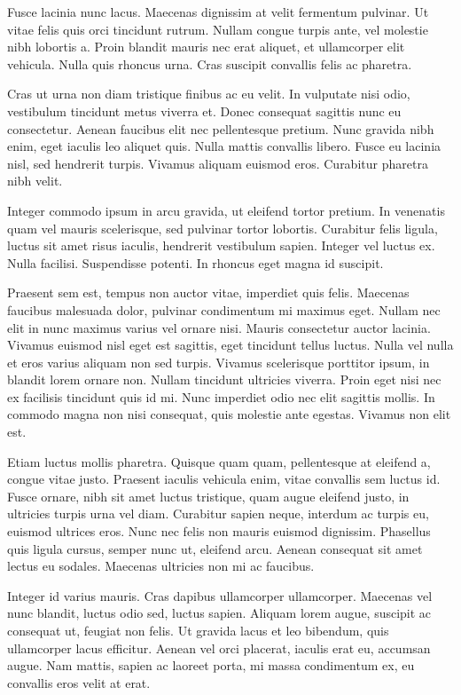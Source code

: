 \documentclass{article}
\begin{document}
	Fusce lacinia nunc lacus. Maecenas dignissim at velit fermentum pulvinar. Ut vitae felis quis orci tincidunt rutrum. Nullam congue turpis ante, vel molestie nibh lobortis a. Proin blandit mauris nec erat aliquet, et ullamcorper elit vehicula. Nulla quis rhoncus urna. Cras suscipit convallis felis ac pharetra.
	
	Cras ut urna non diam tristique finibus ac eu velit. In vulputate nisi odio, vestibulum tincidunt metus viverra et. Donec consequat sagittis nunc eu consectetur. Aenean faucibus elit nec pellentesque pretium. Nunc gravida nibh enim, eget iaculis leo aliquet quis. Nulla mattis convallis libero. Fusce eu lacinia nisl, sed hendrerit turpis. Vivamus aliquam euismod eros. Curabitur pharetra nibh velit.
	
	Integer commodo ipsum in arcu gravida, ut eleifend tortor pretium. In venenatis quam vel mauris scelerisque, sed pulvinar tortor lobortis. Curabitur felis ligula, luctus sit amet risus iaculis, hendrerit vestibulum sapien. Integer vel luctus ex. Nulla facilisi. Suspendisse potenti. In rhoncus eget magna id suscipit.
	
	Praesent sem est, tempus non auctor vitae, imperdiet quis felis. Maecenas faucibus malesuada dolor, pulvinar condimentum mi maximus eget. Nullam nec elit in nunc maximus varius vel ornare nisi. Mauris consectetur auctor lacinia. Vivamus euismod nisl eget est sagittis, eget tincidunt tellus luctus. Nulla vel nulla et eros varius aliquam non sed turpis. Vivamus scelerisque porttitor ipsum, in blandit lorem ornare non. Nullam tincidunt ultricies viverra. Proin eget nisi nec ex facilisis tincidunt quis id mi. Nunc imperdiet odio nec elit sagittis mollis. In commodo magna non nisi consequat, quis molestie ante egestas. Vivamus non elit est.
	
	Etiam luctus mollis pharetra. Quisque quam quam, pellentesque at eleifend a, congue vitae justo. Praesent iaculis vehicula enim, vitae convallis sem luctus id. Fusce ornare, nibh sit amet luctus tristique, quam augue eleifend justo, in ultricies turpis urna vel diam. Curabitur sapien neque, interdum ac turpis eu, euismod ultrices eros. Nunc nec felis non mauris euismod dignissim. Phasellus quis ligula cursus, semper nunc ut, eleifend arcu. Aenean consequat sit amet lectus eu sodales. Maecenas ultricies non mi ac faucibus.
	
	Integer id varius mauris. Cras dapibus ullamcorper ullamcorper. Maecenas vel nunc blandit, luctus odio sed, luctus sapien. Aliquam lorem augue, suscipit ac consequat ut, feugiat non felis. Ut gravida lacus et leo bibendum, quis ullamcorper lacus efficitur. Aenean vel orci placerat, iaculis erat eu, accumsan augue. Nam mattis, sapien ac laoreet porta, mi massa condimentum ex, eu convallis eros velit at erat.
	
\end{document}
